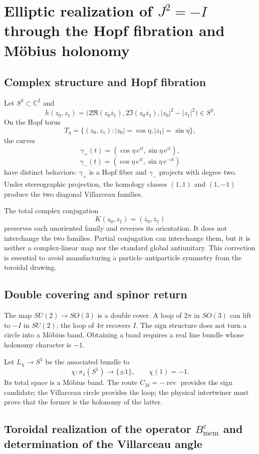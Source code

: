 \section{Elliptic realization of \(J^2=-I\) through the Hopf fibration and Möbius holonomy}

\subsection{Complex structure and Hopf fibration}

Let \(S^3\subset\mathbb C^2\) and
\[
h(z_0,z_1)=
\bigl(2\Re(z_0\overline z_1),
2\Im(z_0\overline z_1),|z_0|^2-|z_1|^2\bigr)
\in S^2.
\]
On the Hopf torus
\[
T_\eta=\{(z_0,z_1):|z_0|=\cos\eta,
|z_1|=\sin\eta\},
\]
the curves
\[
\gamma_+(t)=(\cos\eta\,e^{it},\sin\eta\,e^{it}),
\]
\[
\gamma_-(t)=(\cos\eta\,e^{it},\sin\eta\,e^{-it})
\]
have distinct behaviors: \(\gamma_+\) is a Hopf fiber and
\(\gamma_-\) projects with degree two. Under stereographic projection, the
homology classes \((1,1)\) and \((1,-1)\) produce the two diagonal
Villarceau families.

The total complex conjugation
\[
K(z_0,z_1)=(\overline z_0,\overline z_1)
\]
preserves each unoriented family and reverses its orientation. It does not interchange
the two families. Partial conjugation can interchange them, but it is neither a
complex-linear map nor the standard global antiunitary. This correction
is essential to avoid manufacturing a particle--antiparticle symmetry from the
toroidal drawing.

\subsection{Double covering and spinor return}

The map \(SU(2)\to SO(3)\) is a double cover. A loop of
\(2\pi\) in \(SO(3)\) can lift to \(-I\) in \(SU(2)\); the loop of
\(4\pi\) recovers \(I\). The sign structure does not turn a circle into a
Möbius band. Obtaining a band requires a real line bundle
whose holonomy character is \(-1\).

Let \(L_\chi\to S^1\) be the associated bundle to
\[
\chi:\pi_1(S^1)\longrightarrow\{\pm1\},
\qquad \chi(1)=-1.
\]
Its total space is a Möbius band. The route \(C_M=-\operatorname{rev}\)
provides the sign candidate; the Villarceau circle provides the loop; the
physical intertwiner must prove that the former is the holonomy of the latter.

\subsection{Toroidal realization of the operator \texorpdfstring{\(B_{\mathrm{mem}}^{\varepsilon}\)}{Bmem} and determination of the Villarceau angle}

